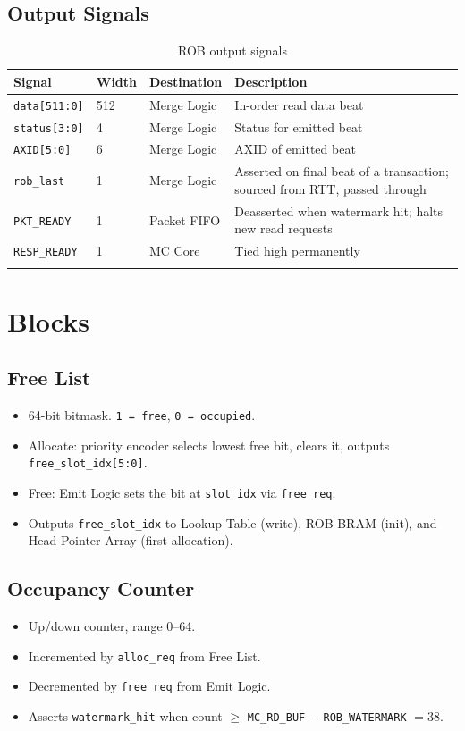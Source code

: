 \documentclass[11pt]{article}
\begin{document}
\subsection*{Output Signals}
\begin{longtable}{p{3cm}p{1cm}p{3cm}p{7cm}}
\toprule
\textbf{Signal} & \textbf{Width} & \textbf{Destination} & \textbf{Description} \\
\midrule
\texttt{data[511:0]}    & 512 & Merge Logic  & In-order read data beat \\
\texttt{status[3:0]}    & 4   & Merge Logic  & Status for emitted beat \\
\texttt{AXID[5:0]}      & 6   & Merge Logic  & AXID of emitted beat \\
\texttt{rob\_last}      & 1   & Merge Logic  & Asserted on final beat of a transaction; sourced from RTT, passed through \\
\texttt{PKT\_READY}     & 1   & Packet FIFO  & Deasserted when watermark hit; halts new read requests \\
\texttt{RESP\_READY}    & 1   & MC Core      & Tied high permanently \\
\bottomrule
\caption{ROB output signals}
\end{longtable}

\section{Blocks}

\subsection{Free List}
\begin{itemize}[noitemsep]
  \item 64-bit bitmask. \texttt{1 = free}, \texttt{0 = occupied}.
  \item Allocate: priority encoder selects lowest free bit, clears it, outputs \texttt{free\_slot\_idx[5:0]}.
  \item Free: Emit Logic sets the bit at \texttt{slot\_idx} via \texttt{free\_req}.
  \item Outputs \texttt{free\_slot\_idx} to Lookup Table (write), ROB BRAM (init), and Head Pointer Array (first allocation).
\end{itemize}

\subsection{Occupancy Counter}
\begin{itemize}[noitemsep]
  \item Up/down counter, range 0--64.
  \item Incremented by \texttt{alloc\_req} from Free List.
  \item Decremented by \texttt{free\_req} from Emit Logic.
  \item Asserts \texttt{watermark\_hit} when count $\geq$ \texttt{MC\_RD\_BUF} $-$ \texttt{ROB\_WATERMARK} $= 38$.
\end{itemize}
\end{document}
